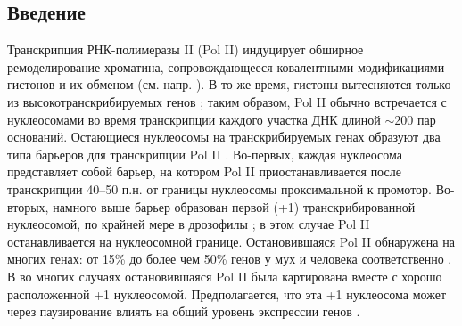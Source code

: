 
\subsection{Введение}
    Транскрипция РНК-полимеразы II (Pol II) индуцирует обширное ремоделирование хроматина, сопровождающееся ковалентными модификациями гистонов и их обменом (см. напр. \cite{smolle_resetting_2013,das_histone_2013,zentner_regulation_2013}). В то же время, гистоны вытесняются только из высокотранскрибируемых генов \cite{kristjuhan_evidence_2004,schwabish_evidence_2004,lee_evidence_2004}; таким образом, Pol II обычно встречается с нуклеосомами во время транскрипции каждого участка ДНК длиной $\sim$200 пар оснований. Остающиеся нуклеосомы на транскрибируемых генах образуют два типа барьеров для транскрипции Pol II \cite{das_histone_2013,weber_nucleosomes_2014}. Во-первых, каждая нуклеосома представляет собой барьер, на котором Pol II приостанавливается после транскрипции 40–50 п.н. от границы нуклеосомы проксимальной к промотор. Во-вторых, намного выше барьер образован первой (+1) транскрибированной нуклеосомой, по крайней мере в дрозофилы \cite{weber_nucleosomes_2014}; в этом случае Pol II останавливается на нуклеосомной границе. Остановившаяся Pol II обнаружена на многих генах: от 15\% до более чем 50\% генов у мух и человека соответственно \cite{guenther_chromatin_2007,muse_rna_2007,zeitlinger_rna_2007}. В во многих случаях остановившаяся Pol II была картирована вместе с хорошо расположенной +1 нуклеосомой. Предполагается, что эта +1 нуклеосома может через паузирование влиять на общий уровень экспрессии генов \cite{weber_nucleosomes_2014,mavrich_nucleosome_2008}. 
    
